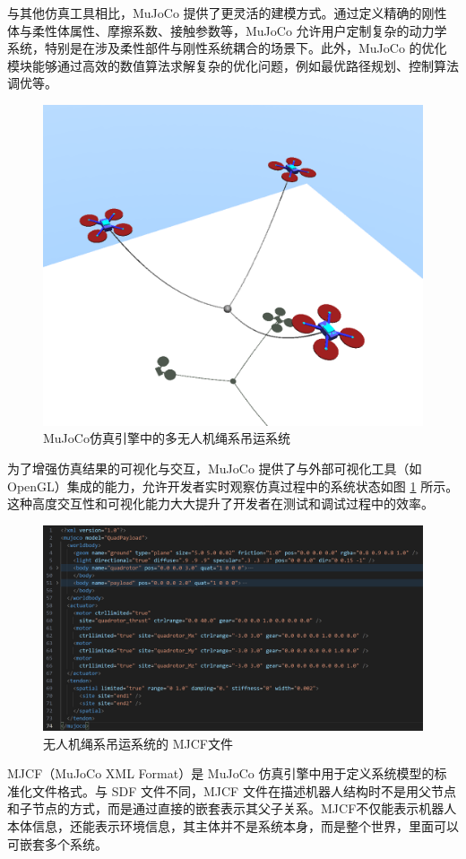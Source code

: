 \documentclass[lang=chs, degree=master, blindreview=true, winfonts=true]{yanputhesis}
\begin{document}
与其他仿真工具相比，MuJoCo 提供了更灵活的建模方式。通过定义精确的刚性体与柔性体属性、摩擦系数、接触参数等，MuJoCo 允许用户定制复杂的动力学系统，特别是在涉及柔性部件与刚性系统耦合的场景下。此外，MuJoCo 的优化模块能够通过高效的数值算法求解复杂的优化问题，例如最优路径规划、控制算法调优等。

\begin{figure}[hbt!]
	\centering
	\includegraphics[width=34pc]{picture/5_3.png} 
	\caption{MuJoCo仿真引擎中的多无人机绳系吊运系统} 
	\label{5_3}
\end{figure}

为了增强仿真结果的可视化与交互，MuJoCo 提供了与外部可视化工具（如 OpenGL）集成的能力，允许开发者实时观察仿真过程中的系统状态如图 \ref{5_3} 所示。这种高度交互性和可视化能力大大提升了开发者在测试和调试过程中的效率。

\begin{figure}[hbt!]
	\centering
	\includegraphics[width=36pc]{picture/MJCF.png} 
	\caption{无人机绳系吊运系统的 MJCF文件} 
	\label{MJCF}
\end{figure}
MJCF（MuJoCo XML Format）是 MuJoCo 仿真引擎中用于定义系统模型的标准化文件格式。与 SDF 文件不同，MJCF 文件在描述机器人结构时不是用父节点和子节点的方式，而是通过直接的嵌套表示其父子关系。MJCF不仅能表示机器人本体信息，还能表示环境信息，其主体并不是系统本身，而是整个世界，里面可以可嵌套多个系统。
\end{document}

